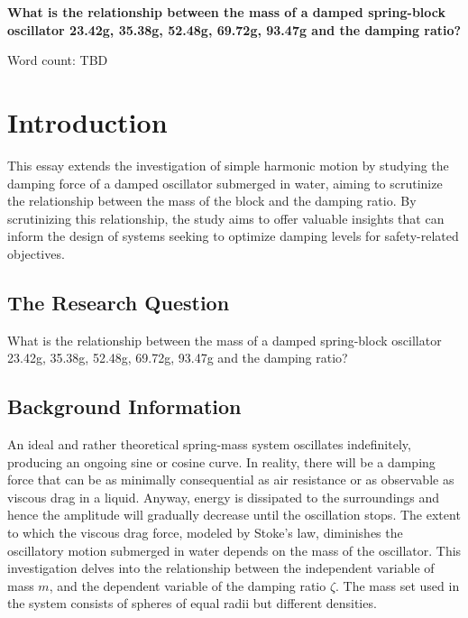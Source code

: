 \documentclass[a4paper,12pt]{article}
\begin{document}
\setlength{\belowcaptionskip}{-40pt}


\pagestyle{fancy}


\begin{titlepage}
  \begin{center}
    \vspace*{3cm}

    {\textbf{\Large{What is the relationship between the mass of a damped spring-block oscillator {23.42g, 35.38g, 52.48g, 69.72g, 93.47g} and the damping ratio?}}}



    \vspace{4cm}

    Word count: TBD

  \end{center}
\end{titlepage}
\pagebreak
\tableofcontents
\pagebreak

\clearpage
\setcounter{page}{1}

\section{Introduction}
This essay extends the investigation of simple harmonic motion by studying the damping force of a damped oscillator submerged in water, aiming to scrutinize the relationship between the mass of the block and the damping ratio. By scrutinizing this relationship, the study aims to offer valuable insights that can inform the design of systems seeking to optimize damping levels for safety-related objectives.


\subsection{The Research Question}
What is the relationship between the mass of a damped spring-block oscillator {23.42g, 35.38g, 52.48g, 69.72g, 93.47g} and the damping ratio?

\subsection{Background Information}
An ideal and rather theoretical spring-mass system oscillates indefinitely, producing an ongoing sine or cosine curve. In reality, there will be a damping force that can be as minimally consequential as air resistance or as observable as viscous drag in a liquid. Anyway, energy is dissipated to the surroundings and hence the amplitude will gradually decrease until the oscillation stops. The extent to which the viscous drag force, modeled by Stoke's law, diminishes the oscillatory motion submerged in water depends on the mass of the oscillator. This investigation delves into the relationship between the independent variable of mass $m$, and the dependent variable of the damping ratio $\zeta$. The mass set used in the system consists of spheres of equal radii but different densities.
\end{document}
